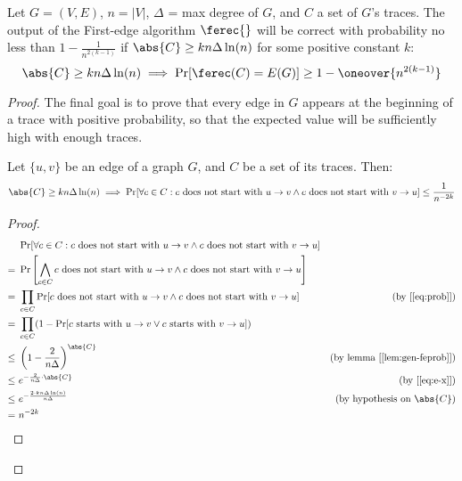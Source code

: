 \begin{theorem}\label{thm:first-edge}
    Let $G = (V, E)$, $n = |V|$, $\Delta$ = max degree of $G$, and $C$ a set of $G$'s traces. The output of the First-edge algorithm $\ferec{}$ will be correct with probability no less than $1 - \frac{1}{n^{2(k - 1)}}$ if $\abs{C} \geq k n \Delta \ln(n)$ for some positive constant $k$:
    \[
        \abs{C} \geq k n \Delta \ln(n) \implies \Pr[\ferec(C) = E(G)] \geq 1 - \oneover{n^{2(k - 1)}}
    \]
\end{theorem}

\begin{proof}

    The final goal is to prove that every edge in $G$ appears at the beginning of a trace with positive probability, so that the expected value will be sufficiently high with enough traces.

    \begin{lemma}\label{lem:fesetprob}
        Let $\{u, v\}$ be an edge of a graph $G$, and $C$ be a set of its traces. Then:
        \[
            \abs{C} \geq k n \Delta \ln(n) \implies \Pr[\forall c \in C : c \text{ does not start with } u \to v \wedge c \text{ does not start with } v \to u] \leq \frac{1}{n^{-2 k}}
        \]
    \end{lemma}

    \begin{proof}
        \begin{align*}
             &\ \Pr[\forall c \in C : c \text{ does not start with } u \to v \wedge c \text{ does not start with } v \to u]     & \\
            =&\ \Pr \left[ \bigwedge_{c \in C} c \text{ does not start with } u \to v \wedge c \text{ does not start with } v \to u \right] & \\
            =&\ \prod_{c \in C} \Pr[c \text{ does not start with } u \to v \wedge c \text{ does not start with } v \to u]       & \text{(by [\ref{eq:prob}])} \\
            =&\ \prod_{c \in C} (1 - \Pr[c \text{ starts with } u \to v \vee c \text{ starts with } v \to u])                   & \\
            \leq&\ \left( 1 - \frac{2}{n \Delta} \right)^{\abs{C}}                                                              & \text{(by lemma [\ref{lem:gen-feprob}])}\\
            \leq&\ e^{-\frac{2}{n \Delta} \cdot \abs{C}}                                                                        & \text{(by [\ref{eq:e-x}])} \\
            \leq&\ e^{-\frac{2 \cdot k n \Delta \ln(n)}{n \Delta}}                                                              & \text{(by hypothesis on $\abs{C}$)} \\
            =&\ n^{-2 k}                                                                                                        & \qedhere \\
        \end{align*}
    \end{proof}


\end{proof}
